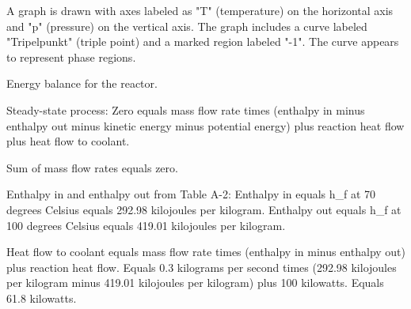 A graph is drawn with axes labeled as "T" (temperature) on the horizontal axis and "p" (pressure) on the vertical axis. The graph includes a curve labeled "Tripelpunkt" (triple point) and a marked region labeled "-1". The curve appears to represent phase regions.

Energy balance for the reactor.  

Steady-state process:  
Zero equals mass flow rate times (enthalpy in minus enthalpy out minus kinetic energy minus potential energy) plus reaction heat flow plus heat flow to coolant.  

Sum of mass flow rates equals zero.  

Enthalpy in and enthalpy out from Table A-2:  
Enthalpy in equals h_f at 70 degrees Celsius equals 292.98 kilojoules per kilogram.  
Enthalpy out equals h_f at 100 degrees Celsius equals 419.01 kilojoules per kilogram.  

Heat flow to coolant equals mass flow rate times (enthalpy in minus enthalpy out) plus reaction heat flow.  
Equals 0.3 kilograms per second times (292.98 kilojoules per kilogram minus 419.01 kilojoules per kilogram) plus 100 kilowatts.  
Equals 61.8 kilowatts.